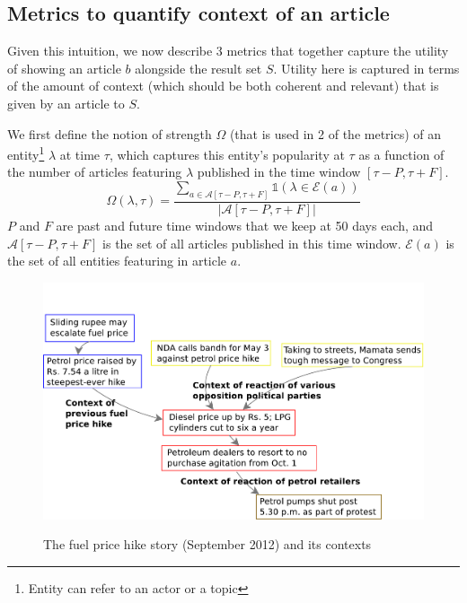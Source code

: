 \subsection{Metrics to quantify context of an article}
\label{sec:finding-context}
Given this intuition, we now describe 3 metrics that together capture the utility of showing an article $b$ alongside the result set $S$. 
Utility here is captured in terms of the amount of context (which should be both coherent and relevant) that is given by an article to $S$. 

We first define the notion of strength $\Omega$ (that is used in 2 of the metrics) of an entity\footnote{Entity can refer to an actor or a topic} $\lambda$ at time $\tau$, which captures this entity's popularity at $\tau$ as a function of the number of articles featuring $\lambda$ published in the time window $[\tau - P, \tau + F]$.
\begin{equation}
\Omega(\lambda, \tau) = \frac{\sum_{a \in \mathcal{A}[\tau - P, \tau + F]}{\mathbb{1}(\lambda \in \mathcal{E}(a))}}{|\mathcal{A}[\tau - P, \tau + F]|}
\end{equation}
$P$ and $F$ are past and future time windows that we keep at 50 days each, and $\mathcal{A}[\tau - P, \tau + F]$ is the set of all articles published in this time window. $\mathcal{E}(a)$ is the set of all entities featuring in article $a$.
\begin{figure}
\caption{The fuel price hike story (September 2012) and its contexts}
\includegraphics[scale=0.30]{figures/graph-petrol.pdf}
\label{fig:petrol}
\end{figure}

